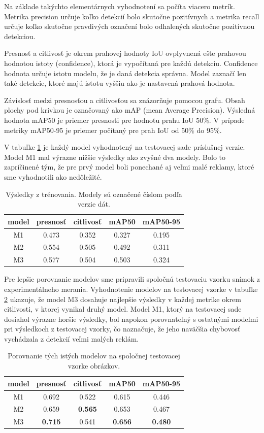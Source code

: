 Na základe takýchto elementárnych vyhodnotení sa počíta viacero metrík. Metrika precision určuje koľko detekcií bolo skutočne pozitívnych a metrika recall určuje koľko skutočne pravdivých označení bolo odhalených skutočne pozitívnou detekciou.

Presnosť a citlivosť je okrem prahovej hodnoty IoU ovplyvnená ešte prahovou hodnotou istoty (confidence), ktorá je vypočítaná pre každú detekciu. Confidence hodnota určuje istotu modelu, že je daná detekcia správna. Model zaznačí len také detekcie, ktoré majú istotu vyššiu ako je nastavená prahová hodnota.

Závislosť medzi presnosťou a citlivosťou sa znázorňuje pomocou grafu. Obsah plochy pod krivkou je označovaný ako mAP (mean Average Precision). Výsledná hodnota mAP50 je priemer presnosti pre hodnotu prahu IoU 50\%. V prípade metriky mAP50-95 je priemer počítaný pre prah IoU od 50\% do 95\%.

V tabuľke \ref{table:test1} je každý model vyhodnotený na testovacej sade príslušnej verzie. Model M1 mal výrazne nižšie výsledky ako zvyšné dva modely. Bolo to zapríčinené tým, že pre prvý model boli ponechané aj veľmi malé reklamy, ktoré sme vyhodnotili ako nedôležité.

\begin{table}[ht]
\centering
\begin{tabular}{ |c c c c c| }
\hline
model & presnosť & citlivosť & mAP50 & mAP50-95 \\
\hline
M1  & 0.473 & 0.352	& 0.327	& 0.195 \\
M2  & 0.554	& 0.505	& 0.492	& 0.311 \\
M3  & 0.577	& 0.504	& 0.503	& 0.324 \\
\hline
\end{tabular}
\caption{Výsledky z trénovania. Modely sú označené číslom podľa verzie dát.}
\label{table:test1}
\end{table}

Pre lepšie porovnanie modelov sme pripravili spoločnú testovaciu vzorku snímok z experimentálneho merania. Vyhodnotenie modelov na testovacej vzorke v tabuľke \ref{table:test2} ukazuje, že model M3 dosahuje najlepšie výsledky v každej metrike okrem citlivosti, v ktorej vynikal druhý model. Model M1, ktorý na testovacej sade dosiahol výrazne horšie výsledky, bol napokon porovnateľný s ostatnými modelmi pri výsledkoch z testovacej vzorky, čo naznačuje, že jeho naväčšia chybovosť vychádzala z detekcií veľmi malých reklám.

\begin{table}[ht]
\centering
\begin{tabular}{ |c c c c c|  }
\hline
model & presnosť & citlivosť & mAP50 & mAP50-95 \\
\hline
M1  & 0.692	& 0.522	& 0.615	& 0.446 \\
M2  & 0.659 & \textbf{0.565} & 0.653 & 0.467 \\
M3  & \textbf{0.715} & 0.541 & \textbf{0.656} & \textbf{0.480} \\
\hline
\end{tabular}
\caption{Porovnanie tých istých modelov na spoločnej testovacej vzorke obrázkov.}
\label{table:test2}
\end{table}

